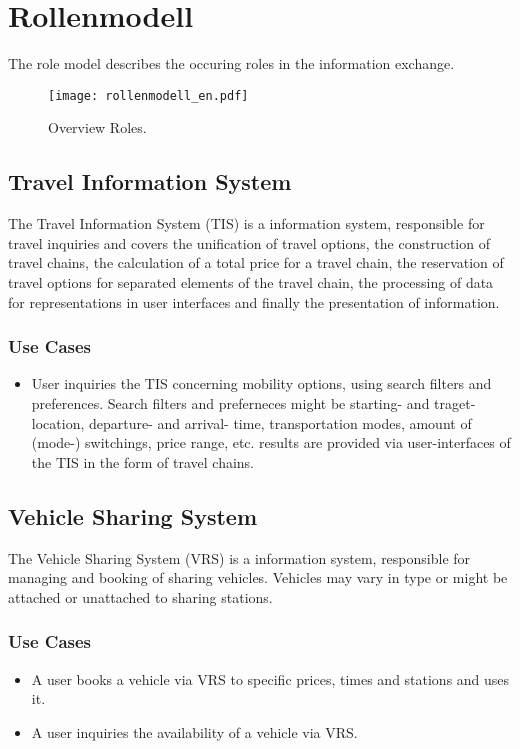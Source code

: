 \chapter{Rollenmodell}
\label{cha:Rollenmodell}

The role model describes the occuring roles in the information exchange.

\begin{figure*}[ht]
\centering
\texttt{[image: rollenmodell\_en.pdf]}
\caption{Overview Roles.\label{fig:Rollenmodell}}
\end{figure*}

\section*{Travel Information System}
\label{sec:Rollenmodell:RIS}
The Travel Information System (TIS) is a information system, responsible for travel inquiries and covers the unification of travel options, the construction of travel chains, the calculation of a total price for a travel chain, the reservation of travel options for separated elements of the travel chain, the processing of data for representations in user interfaces and finally the presentation of information.

\subsection*{Use Cases}
\begin{itemize}
\item User inquiries the TIS concerning mobility options, using search filters and preferences. Search filters and preferneces might be starting- and traget- location, departure- and arrival- time, transportation modes, amount of (mode-) switchings, price range, etc. results are provided via user-interfaces of the TIS in the form of travel chains. 
\end{itemize}

\section*{Vehicle Sharing System}
\label{sec:Rollenmodell:FVS}
The Vehicle Sharing System (VRS) is a information system, responsible for managing and booking of sharing vehicles. Vehicles may vary in type or might be attached or unattached to sharing stations.

\subsection*{Use Cases}
\begin{itemize}
\item A user books a vehicle via VRS to specific prices, times and stations and uses it.
\item A user inquiries the availability of a vehicle via VRS. 
\end{itemize}

